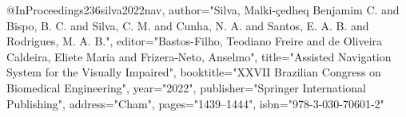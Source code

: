 @InProceedings{236silva2022nav,
author="Silva, Malki-{\c{c}}edheq Benjamim C.
and Bispo, B. C.
and Silva, C. M.
and Cunha, N. A.
and Santos, E. A. B.
and Rodrigues, M. A. B.",
editor="Bastos-Filho, Teodiano Freire
and de Oliveira Caldeira, Eliete Maria
and Frizera-Neto, Anselmo",
title="Assisted Navigation System for the Visually Impaired",
booktitle="XXVII Brazilian Congress on Biomedical Engineering",
year="2022",
publisher="Springer International Publishing",
address="Cham",
pages="1439--1444",
isbn="978-3-030-70601-2"
}